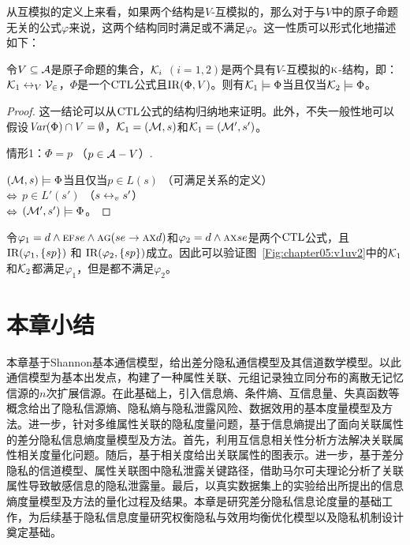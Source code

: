  从互模拟的定义上来看，如果两个结构是$V$-互模拟的，那么对于与$V$中的原子命题无关的公式$\varphi$来说，这两个结构同时满足或不满足$\varphi$。这一性质可以形式化地描述如下：
 
 \begin{theorem}
 	令$V\subseteq {\cal A}$是原子命题的集合，${\cal K}_i$ $(i=1,2)$是两个具有$V$-互模拟的$\textsc{k}$-结构，即：${\cal K}_1 \leftrightarrow_V {\cal V_2}$，$\Phi$是一个$\textrm{CTL}$公式且$\textrm{IR}(\Phi, V)$。则有${\cal K}_1\models \Phi$当且仅当${\cal K}_2\models \Phi$。
 \end{theorem}
\begin{proof}
	这一结论可以从$\textrm{CTL}$公式的结构归纳地来证明。此外，不失一般性地可以假设$\textit{Var}(\Phi) \cap V=\emptyset$，${\cal K}_1=({\cal M},s)$和${\cal K}_1=({\cal M}',s')$。
	
	情形1：$\Phi = p$ （$p\in {\cal A} -V$）.
	
	$({\cal M},s)\models \Phi$当且仅当$p\in L(s)$ \hfill （可满足关系的定义）\\
	$\Leftrightarrow$ $p\in L'(s')$ \hfill （$s \leftrightarrow_v s'$）\\
	$\Leftrightarrow$ $({\cal M}',s') \models \Phi$。
\end{proof}

\begin{example}
	令$\varphi_1 = d \wedge \textsc{e}\textsc{f} se \wedge \textsc{a}\textsc{g}(se \rightarrow \textsc{a}\textsc{x} d)$和$\varphi_2=d \wedge \textsc{a}\textsc{x} se$是两个$\textrm{CTL}$公式，且$\textrm{IR}(\varphi_1,\{sp\})$ 和 $\textrm{IR}(\varphi_2,\{sp\})$成立。因此可以验证图~\ref{Fig:chapter05:v1uv2}中的${\cal K}_1$和${\cal K}_2$都满足$\varphi_1$，但是都不满足$\varphi_2$。
\end{example}
\section{本章小结}
本章基于Shannon基本通信模型，给出差分隐私通信模型及其信道数学模型。以此通信模型为基本出发点，构建了一种属性关联、元组记录独立同分布的离散无记忆信源的$n$次扩展信源。在此基础上，引入信息熵、条件熵、互信息量、失真函数等概念给出了隐私信源熵、隐私熵与隐私泄露风险、数据效用的基本度量模型及方法。进一步，针对多维属性关联的隐私度量问题，基于信息熵提出了面向关联属性的差分隐私信息熵度量模型及方法。首先，利用互信息相关性分析方法解决关联属性相关度量化问题。随后，基于相关度给出关联属性的图表示。进一步，基于差分隐私的信道模型、属性关联图中隐私泄露关键路径，借助马尔可夫理论分析了关联属性导致敏感信息的隐私泄露量。最后，以真实数据集上的实验给出所提出的信息熵度量模型及方法的量化过程及结果。本章是研究差分隐私信息论度量的基础工作，为后续基于隐私信息度量研究权衡隐私与效用均衡优化模型以及隐私机制设计奠定基础。

